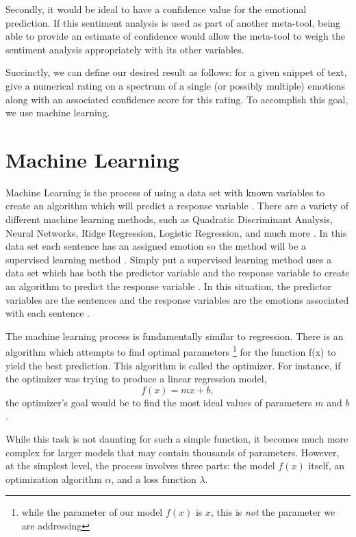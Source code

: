 \documentclass[titlepage,letterpaper]{article}
\begin{document}
Secondly, it would be ideal to have a confidence value for the emotional prediction. If this sentiment analysis is used as part of another meta-tool, being able to provide an estimate of confidence would allow the meta-tool to weigh the sentiment analysis appropriately with its other variables.

Succinctly, we can define our desired result as follows: for a given snippet of text, give a numerical rating on a spectrum of a single (or possibly multiple) emotions along with an associated confidence score for this rating. To accomplish this goal, we use machine learning. 

\section{Machine Learning}

Machine Learning is the process of using a data set with known variables to create an algorithm which will predict a response variable \cite{Statlearning}. There are a variety of different machine learning methods, such as Quadratic Discriminant Analysis, Neural Networks, Ridge Regression, Logistic Regression, and much more \cite{Statlearning}. In this data set each sentence has an assigned emotion so the method will be a supervised learning method \cite{Statlearning}. Simply put a supervised learning method uses a data set which has both the predictor variable and the response variable to create an algorithm to predict the response variable \cite{Statlearning}. In this situation, the predictor variables are the sentences and the response variables are the emotions associated with each sentence \cite{Statlearning}. 

The machine learning process is fundamentally similar to regression. There is an algorithm which attempts to find optimal parameters \footnote{while the parameter of our model $f(x)$ is $x$, this is \emph{not} the parameter we are addressing} for the function f(x) to yield the best prediction. This algorithm is called the optimizer. For instance, if the optimizer was trying to produce a linear regression model, \[f(x) = mx + b, \] the optimizer’s goal would be to find the most ideal values of parameters $m$ and $b$. 

While this task is not daunting for such a simple function, it becomes much more complex for larger models that may contain thousands of parameters. However, at the simplest level, the process involves three parts: the model $f(x)$ itself, an optimization algorithm $\alpha$,  and a loss function $\lambda$.
\end{document}
